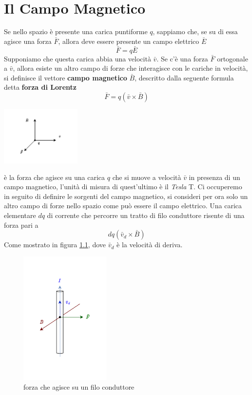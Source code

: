 \documentclass[10pt, letterpaper]{report}
\begin{document}
\chapter{Il Campo Magnetico}
Se nello spazio è presente una carica puntiforme $q$, sappiamo che, se su di essa agisce una forza $\bar F$, allora deve essere presente un campo elettrico $\bar E$
$$ \bar F = q\bar E $$
Supponiamo che questa carica abbia una velocità $\bar v$. Se c'è una forza $\bar F$ ortogonale a $\bar v$, allora esiste un altro campo di forze che interagisce con le cariche in velocità, si definisce il vettore \textbf{campo magnetico} $\bar B$, descritto dalla seguente formula detta \textbf{forza di Lorentz}
$$ \bar F = q(\bar v \times \bar B)$$
\begin{center}
    \includegraphics[width=0.3\textwidth]{images/forzaLorentz.pdf}
\end{center}
è la forza che agisce su una carica $q$ che si muove a velocità $\bar v$ in presenza di un campo magnetico, l'unità di misura di quest'ultimo è il \textit{Tesla} T. Ci occuperemo in seguito di definire le sorgenti del campo magnetico, si consideri per ora solo un altro campo di forze nello spazio come può essere il campo elettrico.\acc 
Una carica elementare $dq$ di corrente che percorre un tratto di filo conduttore risente di una forza pari a $$ dq(\bar v_d\times \bar B)$$
Come mostrato in figura \ref{lorentz}, dove $\bar v_d$ è la velocità di deriva.
\begin{figure}[h!]
    \centering
    \includegraphics[width=0.4\textwidth]{images/forzaLorentz2.pdf}
    \caption{forza che agisce su un filo conduttore}
    \label{lorentz}
\end{figure}
\end{document}
